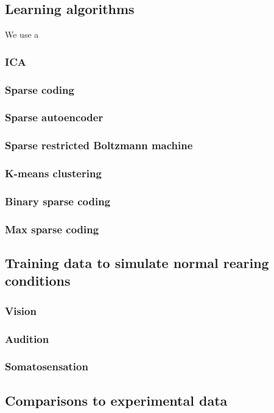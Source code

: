 \documentclass[10pt,letterpaper]{article}
\begin{document}
\subsection{Learning algorithms}
We use a 
\subsubsection{ICA}
\subsubsection{Sparse coding}
\subsubsection{Sparse autoencoder}
\subsubsection{Sparse restricted Boltzmann machine}
\subsubsection{K-means clustering}
\subsubsection{Binary sparse coding}
\subsubsection{Max sparse coding}

\subsection{Training data to simulate normal rearing conditions}
\subsubsection{Vision}
\subsubsection{Audition}
\subsubsection{Somatosensation}

\subsection{Comparisons to experimental data}
\end{document}
